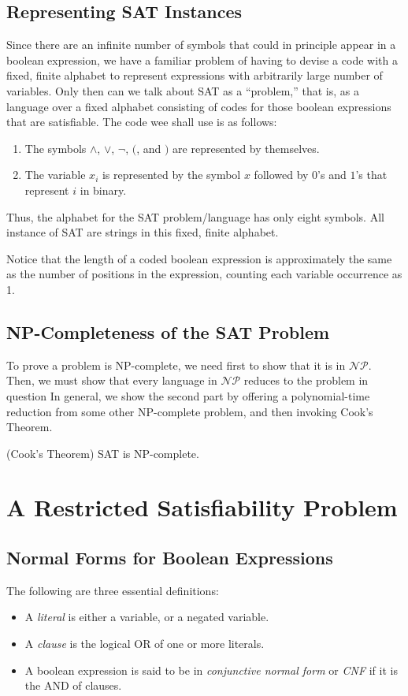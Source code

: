 \documentclass[]{article}
\begin{document}
\subsection*{Representing SAT Instances}
Since there are an infinite number of symbols that could in principle appear in
a boolean expression, we have a familiar problem of having to devise a code with
a fixed, finite alphabet to represent expressions with arbitrarily large number
of variables. Only then can we talk about SAT as a ``problem,'' that is, as a
language over a fixed alphabet consisting of codes for those boolean expressions
that are satisfiable. The code wee shall use is as follows:
\begin{enumerate}
\item The symbols $\wedge$, $\vee$, $\neg$, $($, and $)$ are represented by
themselves.
\item The variable $x_i$ is represented by the symbol $x$ followed by $0$'s and
$1$'s that represent $i$ in binary.
\end{enumerate}
Thus, the alphabet for the SAT problem/language has only eight symbols. All
instance of SAT are strings in this fixed, finite alphabet.

Notice that the length of a coded boolean expression is approximately the same
as the number of positions in the expression, counting each variable occurrence
as 1.

\subsection*{NP-Completeness of the SAT Problem}
To prove a problem is NP-complete, we need first to show that it is in
$\mathcal{NP}$. Then, we must show that every language in $\mathcal{NP}$ reduces
to the problem in question In general, we show the second part by offering a
polynomial-time reduction from some other NP-complete problem, and then invoking
Cook's Theorem.

\begin{thm}
(Cook's Theorem) SAT is NP-complete.
\end{thm}

\section*{A Restricted Satisfiability Problem}
\subsection*{Normal Forms for Boolean Expressions}
The following are three essential definitions:
\begin{itemize}
\item A \emph{literal} is either a variable, or a negated variable.
\item A \emph{clause} is the logical OR of one or more literals.
\item A boolean expression is said to be in \emph{conjunctive normal form} or
\emph{CNF} if it is the AND of clauses.
\end{itemize}
\end{document}
